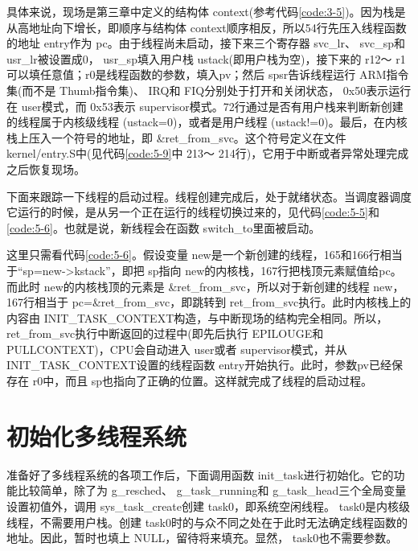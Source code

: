 \documentclass[main.tex]{subfiles}
\begin{document}
\begin{CJK*}{UTF8}{song}
具体来说，现场是第三章中定义的结构体 context(参考代码\ref{code:3-5})。因为栈是从高地址向下增长，即顺序与结构体 context顺序相反，所以54行先压入线程函数的地址 entry作为 pc。由于线程尚未启动，接下来三个寄存器 svc\_\-lr、 svc\_\-sp和 usr\_\-lr被设置成0， usr\_\-sp填入用户栈 ustack(即用户栈为空)，接下来的 r12～ r1可以填任意值；r0是线程函数的参数，填入pv；然后 spsr告诉线程运行 ARM指令集(而不是 Thumb指令集)、 IRQ和 FIQ分别处于打开和关闭状态， 0x50表示运行在 user模式，而 0x53表示  supervisor模式。72行通过是否有用户栈来判断新创建的线程属于内核级线程 (ustack=0)，或者是用户线程 (ustack!=0)。最后，在内核栈上压入一个符号的地址，即  \&ret\_\-from\_\-svc。这个符号定义在文件  kernel\-/\-entry.S中(见代码\ref{code:5-9}中 213～ 214行)，它用于中断或者异常处理完成之后恢复现场。

\par
下面来跟踪一下线程的启动过程。线程创建完成后，处于就绪状态。当调度器调度它运行的时候，是从另一个正在运行的线程切换过来的，见代码\ref{code:5-5}和\ref{code:5-6}。也就是说，新线程会在函数 switch\_\-to里面被启动。

\par
这里只需看代码\ref{code:5-6}。假设变量 new是一个新创建的线程，165和166行相当于“sp=new-\textgreater kstack”，即把 sp指向 new的内核栈，167行把栈顶元素赋值给pc。而此时 new的内核栈顶的元素是  \&ret\_\-from\_\-svc，所以对于新创建的线程 new，167行相当于 pc=\&ret\_\-from\_\-svc，即跳转到 ret\_\-from\_\-svc执行。此时内核栈上的内容由  INIT\_\-TASK\_\-CONTEXT构造，与中断现场的结构完全相同。所以，  ret\_\-from\_\-svc执行中断返回的过程中(即先后执行 EPILOUGE和  PULL\-CONTEXT)，CPU会自动进入 user或者 supervisor模式，并从  INIT\_\-TASK\_\-CONTEXT设置的线程函数  entry开始执行。此时，参数pv已经保存在 r0中，而且 sp也指向了正确的位置。这样就完成了线程的启动过程。

\section{初始化多线程系统}
准备好了多线程系统的各项工作后，下面调用函数 init\_\-task进行初始化。它的功能比较简单，除了为 g\_\-resched、 g\_\-task\_\-running和 g\_\-task\_\-head三个全局变量设置初值外，调用 sys\_\-task\_\-create创建 task0，即系统空闲线程。 task0是内核级线程，不需要用户栈。创建 task0时的与众不同之处在于此时无法确定线程函数的地址。因此，暂时也填上 NULL，留待将来填充。显然， task0也不需要参数。

\begin{code}
\label{code:5-11}
\inputminted[firstline=290,lastline=306,linenos,numbersep=5pt,frame=lines,framesep=2mm]{c}{src/chapter05/kernel/task.c}
\end{code}


\end{CJK*}
\end{document}
